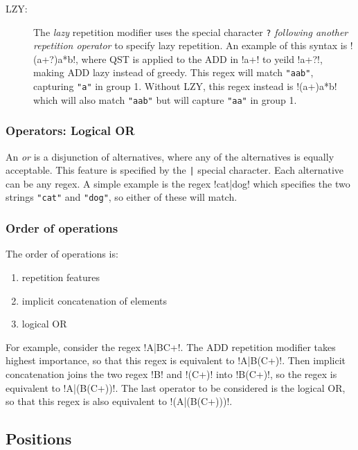 \begin{description}
\item[LZY:] The \emph{lazy} repetition modifier uses the special character \verb!?! \emph{following another repetition operator} to specify lazy repetition.  An example of this syntax is \cverb!(a+?)a*b!, where QST is applied to the ADD in \cverb!a+! to yeild \cverb!a+?!, making ADD lazy instead of greedy.  This regex will match \verb!"aab"!, capturing \verb!"a"! in group 1.  Without LZY, this regex instead is \cverb!(a+)a*b! which will also match \verb!"aab"! but will capture \verb!"aa"! in group 1.
\end{description}

\subsubsection*{Operators: Logical OR}
\begin{description} \itemsep -1pt
\item[OR:] An \emph{or} is a disjunction of alternatives, where any of the alternatives is equally acceptable.  This feature is specified by the \verb!|! special character.  Each alternative can be any regex.  A simple example is the regex \cverb!cat|dog! which specifies the two strings \verb!"cat"! and \verb!"dog"!, so either of these will match.
\end{description}

\subsubsection*{Order of operations}
\label{app:orderOfOperations}
The order of operations is:
\begin{enumerate}\itemsep -1pt
\item repetition features
\item implicit concatenation of elements
\item logical OR
\end{enumerate}
For example, consider the regex \cverb!A|BC+!.  The ADD repetition modifier takes highest importance, so that this regex is equivalent to \cverb!A|B(C+)!.  Then implicit concatenation joins the two regex \cverb!B! and \cverb!(C+)! into \cverb!B(C+)!, so the regex is equivalent to \cverb!A|(B(C+))!.  The last operator to be considered is the logical OR, so that this regex is also equivalent to \cverb!(A|(B(C+)))!.

\subsection*{Positions}

